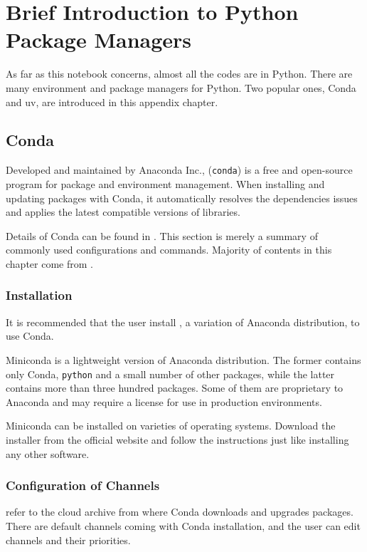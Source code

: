 \chapter{Brief Introduction to Python Package Managers}

As far as this notebook concerns, almost all the codes are in Python. There are many environment and package managers for Python. Two popular ones, Conda and uv, are introduced in this appendix chapter.

\section{Conda}

Developed and maintained by Anaconda Inc.,  (\verb|conda|) is a free and open-source program for package and environment management. When installing and updating packages with Conda, it automatically resolves the dependencies issues and applies the latest compatible versions of libraries.

Details of Conda can be found in \cite{conda2025}. This section is merely a summary of commonly used configurations and commands. Majority of contents in this chapter come from \cite{conda2025cheatsheet}.

\subsection{Installation}

It is recommended that the user install , a variation of Anaconda distribution, to use Conda.

Miniconda is a lightweight version of Anaconda distribution. The former contains only Conda, \verb|python| and a small number of other packages, while the latter contains more than three hundred packages. Some of them are proprietary to Anaconda and may require a license for use in production environments.

Miniconda can be installed on varieties of operating systems. Download the installer from the official website and follow the instructions just like installing any other software.

\subsection{Configuration of Channels}

 refer to the cloud archive from where Conda downloads and upgrades packages. There are default channels coming with Conda installation, and the user can edit channels and their priorities.

